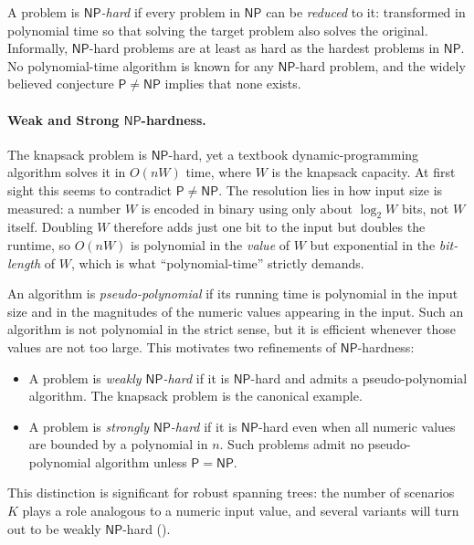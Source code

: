 A problem is \emph{\textcolor{RWTHBlue}{$\mathsf{NP}$-hard}} if every problem in $\mathsf{NP}$ can be \emph{reduced} to it: transformed in polynomial time so that solving the target problem also solves the original.
Informally, $\mathsf{NP}$-hard problems are at least as hard as the hardest problems in $\mathsf{NP}$.
No polynomial-time algorithm is known for any $\mathsf{NP}$-hard problem, and the widely believed conjecture $\mathsf{P} \neq \mathsf{NP}$ implies that none exists.

\paragraph{Weak and Strong $\mathsf{NP}$-hardness.}

The knapsack problem is $\mathsf{NP}$-hard, yet a textbook dynamic-programming algorithm solves it in $O(nW)$ time, where $W$ is the knapsack capacity.
At first sight this seems to contradict $\mathsf{P} \neq \mathsf{NP}$.
The resolution lies in how input size is measured: a number $W$ is encoded in binary using only about $\log_2 W$ bits, not $W$ itself.
Doubling $W$ therefore adds just one bit to the input but doubles the runtime, so $O(nW)$ is polynomial in the \emph{value} of $W$ but exponential in the \emph{bit-length} of $W$, which is what ``polynomial-time'' strictly demands.

An algorithm is \emph{\textcolor{RWTHBlue}{pseudo-polynomial}} if its running time is polynomial in the input size and in the magnitudes of the numeric values appearing in the input.
Such an algorithm is not polynomial in the strict sense, but it is efficient whenever those values are not too large.
This motivates two refinements of $\mathsf{NP}$-hardness:
\begin{itemize}[nosep]
\item A problem is \emph{\textcolor{RWTHBlue}{weakly $\mathsf{NP}$-hard}} if it is $\mathsf{NP}$-hard and admits a pseudo-polynomial algorithm. The knapsack problem is the canonical example.
\item A problem is \emph{\textcolor{RWTHBlue}{strongly $\mathsf{NP}$-hard}} if it is $\mathsf{NP}$-hard even when all numeric values are bounded by a polynomial in $n$. Such problems admit no pseudo-polynomial algorithm unless $\mathsf{P} = \mathsf{NP}$.
\end{itemize}
This distinction is significant for robust spanning trees: the number of scenarios $K$ plays a role analogous to a numeric input value, and several variants will turn out to be weakly $\mathsf{NP}$-hard ().

